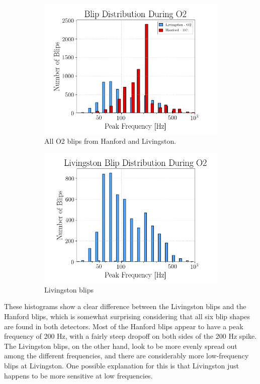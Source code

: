\documentclass[a4paper]{article}
\begin{document}
\begin{figure}[h!]
	\centering
	\begin{subfigure}{.49\textwidth}
		\centering
		\includegraphics[width=1\linewidth]{combined_peakf}
		\caption{All O2 blips from Hanford and Livingston.}
		\label{fig:combined}
	\end{subfigure}
	\begin{subfigure}{.49\textwidth}
		\centering
		\includegraphics[width=1\linewidth]{llo_peakf}
		\caption{Livingston blips}
		\label{fig:llo_peakf}
	\end{subfigure}
	\caption{}
	\label{fig:combined_peakf}
\end{figure}

These histograms show a clear difference between the Livingston blips and the Hanford blips, which is somewhat surprising considering that all six blip shapes are found in both detectors. Most of the Hanford blips appear to have a peak frequency of 200 Hz, with a fairly steep dropoff on both sides of the 200 Hz spike. The Livingston blips, on the other hand, look to be more evenly spread out among the different frequencies, and there are considerably more low-frequency blips at Livingston. One possible explanation for this is that Livingston just happens to be more sensitive at low frequencies. 
\end{document}
